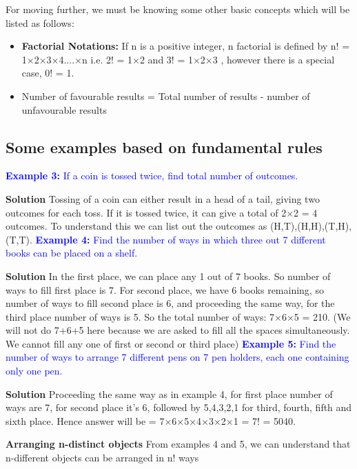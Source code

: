 \documentclass[12pt, a4paper]{article}
\begin{document}
For moving further, we must be knowing some other basic concepts which will be listed as follows:
\begin{itemize}
    \item \textbf{Factorial Notations:} If n is a positive integer, n factorial is defined by n! = 1×2×3×4....×n i.e. 2! = 1×2 and 3! = 1×2×3 , however there is a special case, 0! = 1.
    \item Number of favourable results = Total number of results - number of unfavourable results
\end{itemize}

\newpage
\subsection{Some examples based on fundamental rules}
\textcolor{blue}{\textbf{Example 3:} If a coin is tossed twice, find total number of outcomes.}

\textbf{Solution} Tossing of a coin can either result in a head of a tail, giving two outcomes for each toss. If it is tossed twice, it can give a total of 2×2 = 4 outcomes. To understand this we can list out the outcomes as {(H,T),(H,H),(T,H),(T,T)}.\newline
\textcolor{blue}{\textbf{Example 4:} Find the number of ways in which three out 7 different books can be placed on a shelf.}

\textbf{Solution} In the first place, we can place any 1 out of 7 books. So number of ways to fill first place is 7. For second place, we have 6 books remaining, so number of ways to fill second place is 6, and proceeding the same way, for the third place number of ways is 5. So the total number of ways: 7×6×5 = 210. (We will not do 7+6+5 here because we are asked to fill all the spaces simultaneously. We cannot fill any one of first or second or third place)\newline
\textcolor{blue}{\textbf{Example 5:} Find the number of ways to arrange 7 different pens on 7 pen holders, each one containing only one pen.}

\textbf{Solution} Proceeding the same way as in example 4, for first place number of ways are 7, for second place it's 6, followed by 5,4,3,2,1 for third, fourth, fifth and sixth place. Hence answer will be = 7×6×5×4×3×2×1 = 7! = 5040. 
\begin{tcolorbox}[colback=ProcessBlue!10!White,colframe=Blue!60!White]
\textbf{Arranging n-distinct objects}
From examples 4 and 5, we can understand that n-different objects can be arranged in n! ways
\end{tcolorbox}
\end{document}
